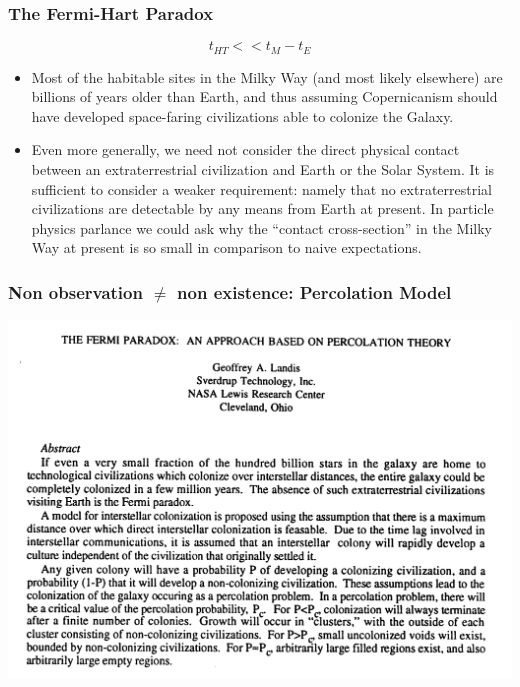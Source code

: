 \begin{frame}
\frametitle{The Fermi-Hart Paradox}

\begin{block}{}

$$ t_{HT} << t_M - t_E$$

\end{block}

\vspace{0.5cm}
\begin{itemize}
\item
Most of the habitable sites in the Milky Way (and most likely elsewhere) are billions of years older than Earth, and thus assuming Copernicanism should have developed space-faring civilizations able to colonize the Galaxy. 
%
\item
Even more generally, we need not consider the direct physical contact between an extraterrestrial civilization and Earth or the Solar System. It is sufficient to consider a weaker requirement: namely that no extraterrestrial civilizations are detectable by any means from Earth at present. In particle physics parlance we could ask why the ``contact cross-section'' in the Milky Way at present is so small in comparison to naive expectations.
\end{itemize}
\end{frame}

\begin{frame}
\frametitle{Non observation $\neq$ non existence: Percolation Model}


\includegraphics[scale=0.5]{percolation.png} 


\end{frame}


